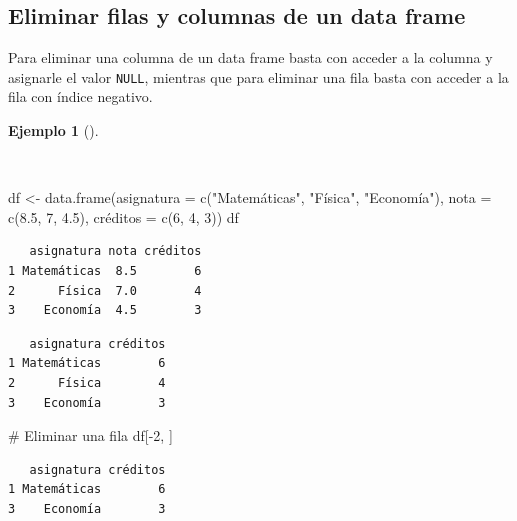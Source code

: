\documentclass[
  a4paper,
]{scrreport}
\newenvironment{Shaded}{\begin{snugshade}}{\end{snugshade}}
\newcommand{\AttributeTok}[1]{\textcolor[rgb]{0.40,0.45,0.13}{#1}}
\newcommand{\CommentTok}[1]{\textcolor[rgb]{0.37,0.37,0.37}{#1}}
\newcommand{\ConstantTok}[1]{\textcolor[rgb]{0.56,0.35,0.01}{#1}}
\newcommand{\DecValTok}[1]{\textcolor[rgb]{0.68,0.00,0.00}{#1}}
\newcommand{\FloatTok}[1]{\textcolor[rgb]{0.68,0.00,0.00}{#1}}
\newcommand{\FunctionTok}[1]{\textcolor[rgb]{0.28,0.35,0.67}{#1}}
\newcommand{\NormalTok}[1]{\textcolor[rgb]{0.00,0.23,0.31}{#1}}
\newcommand{\OtherTok}[1]{\textcolor[rgb]{0.00,0.23,0.31}{#1}}
\newcommand{\SpecialCharTok}[1]{\textcolor[rgb]{0.37,0.37,0.37}{#1}}
\newcommand{\StringTok}[1]{\textcolor[rgb]{0.13,0.47,0.30}{#1}}
\theoremstyle{definition}
\theoremstyle{definition}
\newtheorem{example}{Ejemplo}[chapter]
\theoremstyle{remark}
\begin{document}
\subsection{Eliminar filas y columnas de un data
frame}\label{eliminar-filas-y-columnas-de-un-data-frame}

Para eliminar una columna de un data frame basta con acceder a la
columna y asignarle el valor \texttt{NULL}, mientras que para eliminar
una fila basta con acceder a la fila con índice negativo.

\begin{example}[]\protect\hypertarget{exm-eliminacion-filas-columnas-data-frame}{}\label{exm-eliminacion-filas-columnas-data-frame}

~

\begin{Shaded}
\begin{Highlighting}[]
\NormalTok{df }\OtherTok{\textless{}{-}} \FunctionTok{data.frame}\NormalTok{(}\AttributeTok{asignatura =} \FunctionTok{c}\NormalTok{(}\StringTok{"Matemáticas"}\NormalTok{, }\StringTok{"Física"}\NormalTok{, }\StringTok{"Economía"}\NormalTok{), }\AttributeTok{nota =} \FunctionTok{c}\NormalTok{(}\FloatTok{8.5}\NormalTok{, }\DecValTok{7}\NormalTok{, }\FloatTok{4.5}\NormalTok{), créditos }\OtherTok{=} \FunctionTok{c}\NormalTok{(}\DecValTok{6}\NormalTok{, }\DecValTok{4}\NormalTok{, }\DecValTok{3}\NormalTok{))}
\NormalTok{df}
\end{Highlighting}
\end{Shaded}

\begin{verbatim}
   asignatura nota créditos
1 Matemáticas  8.5        6
2      Física  7.0        4
3    Economía  4.5        3
\end{verbatim}

\begin{Shaded}
\end{Shaded}

\begin{verbatim}
   asignatura créditos
1 Matemáticas        6
2      Física        4
3    Economía        3
\end{verbatim}

\begin{Shaded}
\begin{Highlighting}[]
\CommentTok{\# Eliminar una fila}
\NormalTok{df[}\SpecialCharTok{{-}}\DecValTok{2}\NormalTok{, ]}
\end{Highlighting}
\end{Shaded}

\begin{verbatim}
   asignatura créditos
1 Matemáticas        6
3    Economía        3
\end{verbatim}

\end{example}
\end{document}
